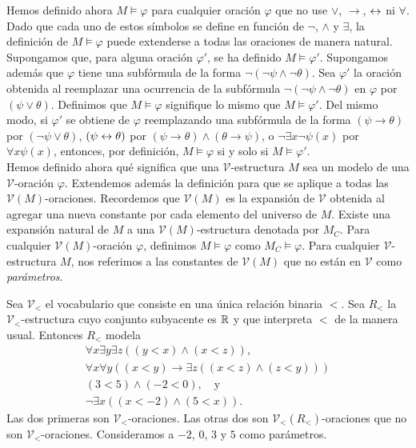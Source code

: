 \documentclass[12pt,a4paper]{book}
\newcommand{\VV}{\mathcal{V}}
\begin{document}
    Hemos definido ahora $M\models\varphi$ para cualquier oración $\varphi$ que no use $\vee$, $\rightarrow$, $\leftrightarrow$ ni
    $\forall$. Dado que cada uno de estos símbolos se define en función de $\neg$, $\wedge$ y $\exists$, la definición de
    $M\models\varphi$ puede extenderse a todas las oraciones de manera natural. Supongamos que, para alguna oración
    $\varphi'$, se ha definido $M\models\varphi'$. Supongamos además que $\varphi$ tiene una subfórmula de la forma
    $\neg(\neg\psi\wedge\neg\theta)$. Sea $\varphi'$ la oración obtenida al reemplazar una ocurrencia de la subfórmula
    $\neg(\neg\psi\wedge\neg\theta)$ en $\varphi$ por $(\psi\vee\theta)$. Definimos que $M\models\varphi$ signifique lo
    mismo que $M\models\varphi'$. Del mismo modo, si $\varphi'$ se obtiene de $\varphi$ reemplazando una subfórmula de la
    forma $(\psi\rightarrow\theta)$ por $(\neg\psi\vee\theta)$, $(\psi\leftrightarrow\theta)$ por $(\psi\rightarrow\theta)\wedge(\theta\rightarrow\psi)$,
    o $\neg\exists x\neg\psi(x)$ por $\forall x\psi(x)$, entonces, por definición, $M\models\varphi$ si y solo si
    $M\models\varphi'$.\\
    Hemos definido ahora qué significa que una $\VV$-estructura $M$ sea un modelo de una $\VV$-oración $\varphi$.
    Extendemos además la definición para que se aplique a todas las $\VV(M)$-oraciones. Recordemos que $\VV(M)$ es la
    expansión de $\VV$ obtenida al agregar una nueva constante por cada elemento del universo de $M$. Existe una expansión
    natural de $M$ a una $\VV(M)$-estructura denotada por $M_{C}$. Para cualquier $\VV(M)$-oración $\varphi$, definimos
    $M\models\varphi$ como $M_{C}\models\varphi$. Para cualquier $\VV$-estructura $M$, nos referimos a las constantes de
    $\VV(M)$ que no están en $\VV$ como \textit{parámetros}.

    \begin{ejemplo}\label{ej:parametros}
        Sea $\VV_{<}$ el vocabulario que consiste en una única relación binaria $<$. Sea $R_{<}$ la $\VV_{<}$-estructura
        cuyo conjunto subyacente es $\mathbb{R}$ y que interpreta $<$ de la manera usual. Entonces $R_{<}$ modela
        \begin{gather*}
            \forall x\exists y\exists z((y<x)\wedge(x<z)),\\
            \forall x\forall y((x<y)\rightarrow\exists z((x<z)\wedge(z<y)))\\
            (3<5)\wedge(-2<0),\quad\text{y}\\
            \neg\exists x((x<-2)\wedge(5<x)).
        \end{gather*}
        Las dos primeras son $\VV_{<}$-oraciones. Las otras dos son $\VV_{<}(R_{<})$-oraciones que no son
        $\VV_{<}$-oraciones. Consideramos a $-2$, $0$, $3$ y $5$ como parámetros.
    \end{ejemplo}
\end{document}
